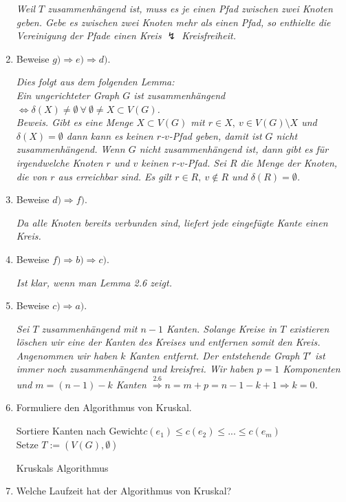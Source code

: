 \documentclass[a4paper,10pt]{scrreprt}
\begin{document}
\begin{enumerate}
		\textit{Weil $T$ zusammenhängend ist, muss es je einen Pfad zwischen zwei Knoten geben. Gebe es zwischen zwei Knoten mehr als einen Pfad, so enthielte die Vereinigung der Pfade einen Kreis $\lightning$ Kreisfreiheit.}
		\item Beweise $g) \Rightarrow e) \Rightarrow d)$.
		
		\textit{Dies folgt aus dem folgenden Lemma:\\
			Ein ungerichteter Graph $G$ ist zusammenhängend $\Leftrightarrow \delta(X) \neq \emptyset~ \forall ~\emptyset \neq X \subset V(G)$.\\[5pt]
			Beweis. Gibt es eine Menge $X\subset V(G)$ mit $r\in X,~v\in V(G)\setminus X$ und $\delta(X) = \emptyset$ dann kann es keinen $r$-$v$-Pfad geben, damit ist $G$ nicht zusammenhängend. Wenn $G$ nicht zusammenhängend ist, dann gibt es für irgendwelche Knoten $r$ und $v$ keinen $r$-$v$-Pfad. Sei $R$ die Menge der Knoten, die von $r$ aus erreichbar sind. Es gilt $r\in R,~v\notin R$ und $\delta(R)=\emptyset$.}
		\item Beweise $d) \Rightarrow f)$.
		
		\textit{Da alle Knoten bereits verbunden sind, liefert jede eingefügte Kante einen Kreis.}
		\item Beweise $f) \Rightarrow b) \Rightarrow c)$.
		
		\textit{Ist klar, wenn man Lemma 2.6 zeigt.}
		\item Beweise $c) \Rightarrow a)$.
		
		\textit{Sei $T$ zusammenhängend mit $n-1$ Kanten. Solange Kreise in $T$ existieren löschen wir eine der Kanten des Kreises und entfernen somit den Kreis. Angenommen wir haben $k$ Kanten entfernt. Der entstehende Graph $T'$ ist immer noch zusammenhängend und kreisfrei. Wir haben $p=1$ Komponenten und $m=(n-1)-k$ Kanten $\overset{2.6}{\Rightarrow} n =m+p=n-1-k+1 \Rightarrow k=0$.}
		\item Formuliere den Algorithmus von Kruskal.
		\begin{algorithm}
			\vspace*{5pt}
			Sortiere Kanten nach Gewicht\newline $c(e_1)\le c(e_2)\le ... \le c(e_m)$\\
			Setze $T:=(V(G), \emptyset)$\\
			{
			}
			\caption{Kruskals Algorithmus}
		\end{algorithm}
		\item Welche Laufzeit hat der Algorithmus von Kruskal?
		

\end{enumerate}
\end{document}
